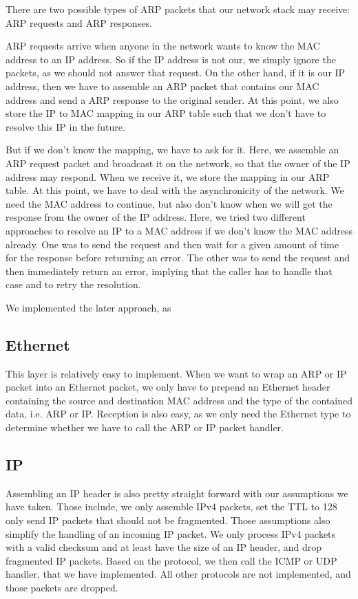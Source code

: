 There are two possible types of ARP packets that our network stack may receive: ARP requests and ARP responses. 

ARP requests arrive when anyone in the network wants to know the MAC address to an IP address. So if the IP address is not our, we simply ignore the packets, as we should not answer that request. On the other hand, if it is our IP address, then we have to assemble an ARP packet that contains our MAC address and send a ARP response to the original sender. At this point, we also store the IP to MAC mapping in our ARP table such that we don't have to resolve this IP in the future.

But if we don't know the mapping, we have to ask for it. Here, we assemble an ARP request packet and broadcast it on the network, so that the owner of the IP address may respond. When we receive it, we store the mapping in our ARP table.
At this point, we have to deal with the asynchronicity of the network. We need the MAC address to continue, but also don't know when we will get the response from the owner of the IP address.
Here, we tried two different approaches to resolve an IP to a MAC address if we don't know the MAC address already. One was to send the request and then wait for a given amount of time for the response before returning an error. The other was to send the request and then immediately return an error, implying that the caller has to handle that case and to retry the resolution. 

We implemented the later approach, as %

\subsection{Ethernet}

This layer is relatively easy to implement. When we want to wrap an ARP or IP packet into an Ethernet packet, we only have to prepend an Ethernet header containing the source and destination MAC address and the type of the contained data, i.e. ARP or IP.
Reception is also easy, as we only need the Ethernet type to determine whether we have to call the ARP or IP packet handler.

\subsection{IP}

Assembling an IP header is also pretty straight forward with our assumptions we have taken. Those include, we only assemble IPv4 packets, set the TTL to 128 only send IP packets that should not be fragmented.
Those assumptions also simplify the handling of an incoming IP packet. We only process IPv4 packets with a valid checksum and at least have the size of an IP header, and drop fragmented IP packets. Based on the protocol, we then call the ICMP or UDP handler, that we have implemented. All other protocols are not implemented, and those packets are dropped.

